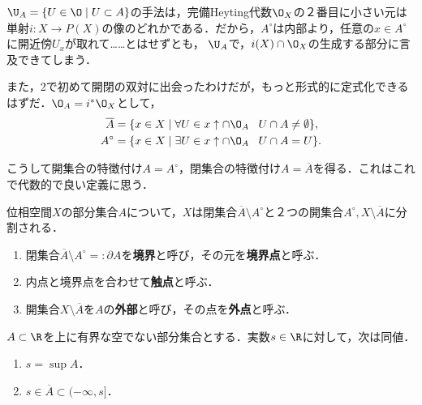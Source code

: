 \documentclass[uplatex,dvipdfmx]{jsreport}
\begin{document}
\begin{remark}
    $\U_A=\{U\in\O\mid U\subset A\}$の手法は，完備Heyting代数$\O_X$の２番目に小さい元は
    単射$i:X\to P(X)$の像のどれかである．だから，$A^\circ$は内部より，任意の$x\in A^\circ$に開近傍$U_x$が取れて……とはせずとも，
    $\U_A$で，$i(X)\cap\O_X$の生成する部分に言及できてしまう．
    
    また，2で初めて開閉の双対に出会ったわけだが，もっと形式的に定式化できるはずだ．$\O_A=i^*\O_X$として，
    \begin{align*}
        \overline{A}&=\{x\in X\mid \forall U\in x\uparrow\cap\O_A\;\;\;U\cap A\ne\emptyset\},\\
        A^\circ&=\{x\in X\mid \exists U\in x\uparrow\cap\O_A\;\;\;U\cap A=U\}.
    \end{align*}
\end{remark}

\begin{remark}
    こうして開集合の特徴付け$A=A^\circ$，閉集合の特徴付け$A=\overline{A}$を得る．これはこれで代数的で良い定義に思う．
\end{remark}

\begin{definition}
    位相空間$X$の部分集合$A$について，$X$は閉集合$\overline{A}\setminus A^\circ$と２つの開集合$A^\circ,X\setminus\overline{A}$に分割される．
    \begin{enumerate}
        \item 閉集合$\overline{A}\setminus A^\circ=:\partial A$を\textbf{境界}と呼び，その元を\textbf{境界点}と呼ぶ．
        \item 内点と境界点を合わせて\textbf{触点}と呼ぶ．
        \item 開集合$X\setminus\overline{A}$を$A$の\textbf{外部}と呼び，その点を\textbf{外点}と呼ぶ．
    \end{enumerate}
\end{definition}

\begin{proposition}[実数の部分集合の上限の特徴付け]\label{prop-characterization-of-supremum}
    $A\subset\R$を上に有界な空でない部分集合とする．実数$s\in\R$に対して，次は同値．
    \begin{enumerate}
        \item $s=\sup A$．
        \item $s\in\overline{A}\subset(-\infty,s]$．
    \end{enumerate}
\end{proposition}
\end{document}
